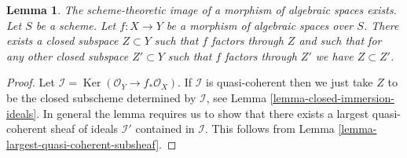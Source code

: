 \documentclass[10pt,a4paper]{amsart}
\newenvironment{slogan}{\comment}{\endcomment}
\theoremstyle{plain}
\newtheorem{lemma}[subsection]{Lemma}
\theoremstyle{definition}
\theoremstyle{remark}
\numberwithin{equation}{subsection}
\def\Ker{\mathop{\mathrm{Ker}}}
\begin{document}
\begin{lemma}
\label{lemma-scheme-theoretic-image}
\begin{slogan}
The scheme-theoretic image of a morphism of algebraic spaces exists.
\end{slogan}
Let $S$ be a scheme. Let $f : X \to Y$ be a morphism of algebraic spaces
over $S$. There exists a closed subspace $Z \subset Y$ such that $f$ factors
through $Z$ and such that for any other closed subspace $Z' \subset Y$
such that $f$ factors through $Z'$ we have $Z \subset Z'$.
\end{lemma}

\begin{proof}
Let $\mathcal{I} = \Ker(\mathcal{O}_Y \to f_*\mathcal{O}_X)$.
If $\mathcal{I}$ is quasi-coherent then we just take $Z$ to be the
closed subscheme determined by $\mathcal{I}$, see
Lemma \ref{lemma-closed-immersion-ideals}.
In general the lemma requires us to show that there exists
a largest quasi-coherent sheaf of ideals $\mathcal{I}'$ contained in
$\mathcal{I}$.
This follows from Lemma \ref{lemma-largest-quasi-coherent-subsheaf}.
\end{proof}
\end{document}
